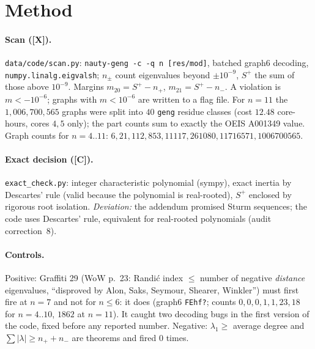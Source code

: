 \documentclass[10pt]{article}
\newcommand{\tier}[1]{\textsf{[#1]}}
\newcommand{\tC}{\tier{C}}
\newcommand{\tX}{\tier{X}}
\begin{document}
\section{Method}\label{sec:method}
\paragraph{Scan (\tX{}).} \texttt{data/code/scan.py}: \texttt{nauty-geng -c -q n [res/mod]}, batched graph6 decoding, \texttt{numpy.linalg.eigvalsh}; $n_\pm$ count eigenvalues beyond $\pm10^{-9}$, $S^+$ the sum of those above $10^{-9}$. Margins $m_{20}=S^+-n_+$, $m_{21}=S^+-n_-$. A violation is $m<-10^{-6}$; graphs with $m<10^{-6}$ are written to a flag file. For $n=11$ the $1{,}006{,}700{,}565$ graphs were split into $40$ \texttt{geng} residue classes (cost $12.48$ core-hours, cores $4,5$ only); the part counts sum to exactly the OEIS A001349 value. Graph counts for $n=4..11$: $6,21,112,853,11117,261080,11716571,1006700565$.
\paragraph{Exact decision (\tC{}).} \texttt{exact\_check.py}: integer characteristic polynomial (sympy), exact inertia by Descartes' rule (valid because the polynomial is real-rooted), $S^+$ enclosed by rigorous root isolation. \emph{Deviation:} the addendum promised Sturm sequences; the code uses Descartes' rule, equivalent for real-rooted polynomials (audit correction~8).
\paragraph{Controls.} Positive: Graffiti 29 (WoW p.~23: Randi\'c index $\le$ number of negative \emph{distance} eigenvalues, ``disproved by Alon, Saks, Seymour, Shearer, Winkler'') must first fire at $n=7$ and not for $n\le6$: it does (graph6 \texttt{FEhf?}; counts $0,0,0,1,1,23,18$ for $n=4..10$, $1862$ at $n=11$). It caught two decoding bugs in the first version of the code, fixed before any reported number. Negative: $\lambda_1\ge$ average degree and $\sum|\lambda|\ge n_++n_-$ are theorems and fired $0$ times.
\end{document}
